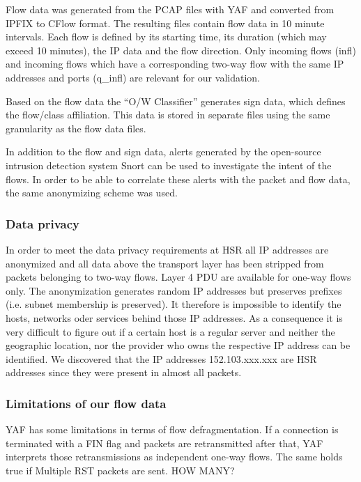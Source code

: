 \documentclass[a4paper]{scrartcl}
\begin{document}
Flow  data was generated from the PCAP files with YAF \cite{yaf} and converted from IPFIX to CFlow format. The resulting files contain flow data in 10 minute intervals. Each flow is defined by its starting time, its duration (which may exceed 10 minutes), the IP data and the flow direction. Only incoming flows (infl) and incoming flows which have a corresponding two-way flow with the same IP addresses and ports (q\_infl) are relevant for our validation.

Based on the flow data the ``O/W Classifier'' generates sign data, which defines the flow/class affiliation. This data is stored in separate files using the same granularity as the flow data files.

In addition to the flow and sign data, alerts generated by the open-source intrusion detection system Snort can be used to investigate the intent of the flows. In order to be able to correlate these alerts with the packet and flow data, the same anonymizing scheme was used.

\subsubsection{Data privacy}
In order to meet the data privacy requirements at HSR all IP addresses are anonymized and all data above the transport layer has been stripped from packets belonging to two-way flows. Layer 4 PDU are available for one-way flows only. The anonymization generates random IP addresses but preserves prefixes (i.e. subnet membership is preserved). It therefore is impossible to identify the hosts, networks oder services behind those IP addresses. As a consequence it is very difficult to figure out if a certain host is a regular server and neither the geographic location, nor the provider who owns the respective IP address can be identified. We discovered that the IP addresses 152.103.xxx.xxx are HSR addresses since they were present in almost all packets.

\subsubsection{Limitations of our flow data}
YAF has some limitations in terms of flow defragmentation. If a connection is terminated with a FIN flag and packets are retransmitted after that, YAF interprets those retransmissions as independent one-way flows. The same holds true if Multiple RST packets are sent. HOW MANY?
\end{document}
